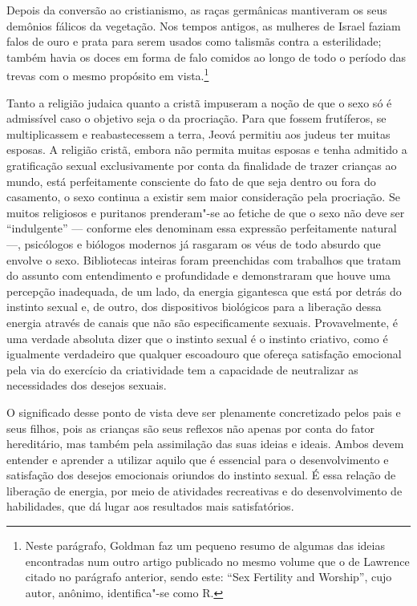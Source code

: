 Depois da conversão ao cristianismo, as raças germânicas mantiveram %
os seus demônios fálicos da vegetação. Nos tempos antigos, as mulheres
de Israel faziam falos de ouro e prata para serem usados como talismãs
contra a esterilidade; também havia os doces em forma de falo
comidos ao longo de todo o período das trevas com o mesmo propósito em
vista.\footnote{Neste parágrafo, Goldman faz um pequeno resumo de
  algumas das ideias encontradas num outro artigo publicado no mesmo
  volume que o de Lawrence citado no parágrafo anterior, sendo este:
  ``Sex Fertility and Worship'', cujo autor, anônimo, identifica"-se como
  R.}

Tanto a religião judaica quanto a cristã impuseram a noção de que o
sexo só é admissível caso o objetivo seja o da procriação. Para que fossem
frutíferos, se multiplicassem e reabastecessem a terra, Jeová permitiu
aos judeus ter muitas esposas. A religião cristã, embora não permita
muitas esposas e tenha admitido a gratificação sexual exclusivamente por conta da
finalidade de trazer crianças ao mundo, está perfeitamente consciente do
fato de que seja dentro ou fora do casamento, o sexo continua a existir
sem maior consideração pela procriação. Se muitos religiosos e
puritanos prenderam"-se ao fetiche de que o sexo não deve ser ``indulgente''
--- conforme eles denominam essa expressão perfeitamente natural ---,
psicólogos e biólogos modernos já rasgaram os véus de todo absurdo que
envolve o sexo. Bibliotecas inteiras foram preenchidas com trabalhos que
tratam do assunto com entendimento e profundidade e demonstraram que
houve uma percepção inadequada, de um lado, da energia gigantesca que
está por detrás do instinto sexual e, de outro, dos dispositivos
biológicos para a liberação dessa energia através de canais que não são
especificamente sexuais. Provavelmente, é uma verdade absoluta dizer que
o instinto sexual é o instinto criativo, como é igualmente verdadeiro
que qualquer escoadouro que ofereça satisfação emocional pela via do
exercício da criatividade tem a capacidade de neutralizar as
necessidades dos desejos sexuais.

O significado desse ponto de vista deve ser plenamente concretizado
pelos pais e seus filhos, pois as crianças são seus reflexos não apenas
por conta do fator hereditário, mas também pela assimilação das suas
ideias e ideais. Ambos devem entender e aprender a utilizar aquilo que é
essencial para o desenvolvimento e satisfação dos desejos emocionais oriundos
do instinto sexual. É essa relação de liberação de energia, por meio
de atividades recreativas e do desenvolvimento de habilidades, que dá lugar
aos resultados mais satisfatórios.

